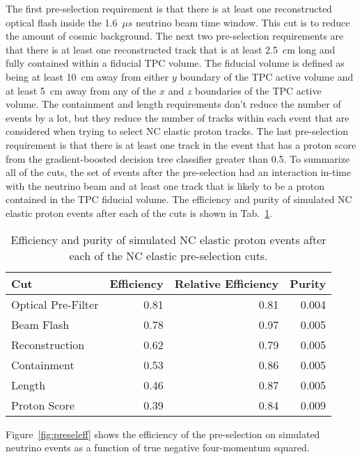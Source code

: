     The first pre-selection requirement is that there is at least one
    reconstructed optical flash inside the 1.6~$\mu s$ neutrino beam time
    window. This cut is to reduce the amount of cosmic background. The next two
    pre-selection requirements are that there is at least one reconstructed
    track that is at least 2.5~cm long and fully contained within a fiducial
    TPC volume. The fiducial volume is defined as being at least 10~cm away
    from either $y$ boundary of the TPC active volume and at least 5~cm away
    from any of the $x$ and $z$ boundaries of the TPC active volume. The
    containment and length requirements don't reduce the number of events by a
    lot, but they reduce the number of tracks within each event that are
    considered when trying to select NC elastic proton tracks. The last
    pre-selection requirement is that there is at least one track in the event
    that has a proton score from the gradient-boosted decision tree classifier
    greater than 0.5. To summarize all of the cuts, the set of events after the
    pre-selection had an interaction in-time with the neutrino beam and at
    least one track that is likely to be a proton contained in the TPC fiducial
    volume.  The efficiency and purity of simulated NC elastic proton events
    after each of the cuts is shown in Tab.~\ref{tab:preseleff}.
    \begin{table}
      \caption{Efficiency and purity of simulated NC elastic proton events
        after each of the NC elastic pre-selection cuts.
      \label{tab:preseleff}}
      \begin{tabularx}{\textwidth}{l r r r}
        \hline
        Cut & Efficiency & Relative Efficiency & Purity \\
        \hline
        Optical Pre-Filter & 0.81 & 0.81 & 0.004 \\
        Beam Flash & 0.78 & 0.97 & 0.005 \\
        Reconstruction & 0.62 & 0.79 & 0.005 \\
        Containment & 0.53 & 0.86 & 0.005 \\
        Length & 0.46 & 0.87 & 0.005 \\
        Proton Score & 0.39 & 0.84 & 0.009 \\
        \hline
      \end{tabularx}
    \end{table}
    Figure~\ref{fig:preseleff} shows the efficiency of the pre-selection on
    simulated neutrino events as a function of true negative four-momentum
    squared.
